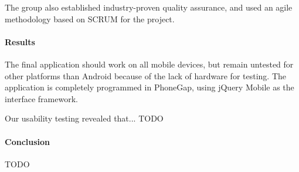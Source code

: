 The group also established industry-proven quality assurance, and used an agile
methodology based on SCRUM for the project. 

\paragraph{Results}
The final application should work on all mobile devices, but remain untested for
other platforms than Android because of the lack of hardware for testing. The
application is completely programmed in PhoneGap, using jQuery Mobile as the
interface framework.

Our usability testing revealed that... TODO

\paragraph{Conclusion}
TODO


